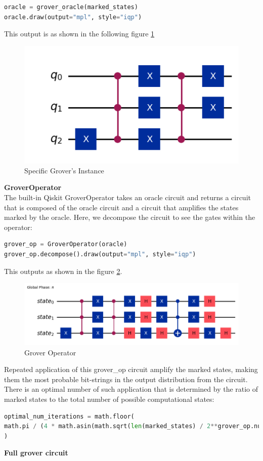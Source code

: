 \documentclass[12pt, oneside]{book}
\theoremstyle{definition}
\theoremstyle{definition}
\theoremstyle{remark}
\begin{document}
\begin{enumerate}
\begin{lstlisting}[language=Python]
oracle = grover_oracle(marked_states)
oracle.draw(output="mpl", style="iqp")
\end{lstlisting}
This output is as shown in the following figure \ref{fig:grover_tut_markedstates}
\begin{figure}[H]
    \centering
    \includegraphics[width=0.5\linewidth]{../images/grover_tut_markedstates.png}
    \caption{Specific Grover's Instance}
    \label{fig:grover_tut_markedstates}
\end{figure}
\textbf{GroverOperator}\\
The built-in Qiskit GroverOperator takes an oracle circuit and returns a circuit that is composed of the oracle circuit and a circuit that amplifies the states marked by the oracle. Here, we decompose the circuit to see the gates within the operator:
\begin{lstlisting}[language=Python]
grover_op = GroverOperator(oracle)
grover_op.decompose().draw(output="mpl", style="iqp")
\end{lstlisting}
This outputs as shown in the figure \ref{fig:grover_op}.
\begin{figure}[H]
    \centering
    \includegraphics[width=0.6\linewidth]{../images/grover_op.png}
    \caption{Grover Operator}
    \label{fig:grover_op}
\end{figure}
Repeated application of this grover\_op circuit amplify the marked states, making them the most probable bit-strings in the output distribution from the circuit. There is an optimal number of such application that is determined by the ratio of marked states to the total number of possible computational states:
\begin{lstlisting}[language=Python]
optimal_num_iterations = math.floor(
math.pi / (4 * math.asin(math.sqrt(len(marked_states) / 2**grover_op.num_qubits)))
)
\end{lstlisting}
\textbf{Full grover circuit\\}

\end{enumerate}
\end{document}
